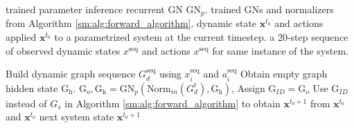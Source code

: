 \begin{algorithm}[tb]
   \caption{Forward prediction with System ID.}
   \label{sm:alg:sysid_forward}
\begin{algorithmic}
    trained parameter inference recurrent GN $\textrm{GN}_p$.
    trained GNs and normalizers from Algorithm \ref{sm:alg:forward_algorithm}.
    dynamic state $\textbf{x}^{t_0}$ and actions applied $\textbf{x}^{t_0}$ to a parametrized system at the current timestep.
    a 20-step sequence of observed dynamic states $x^\textrm{seq}$ and actions $x^\textrm{seq}$ for same instance of the system.
   
   \STATE Build dynamic graph sequence $G^\textrm{seq}_d$ using
   $x^\textrm{seq}_i$ and $a^\textrm{seq}_i$
   \STATE Obtain empty graph hidden state $\textrm{G}_\textrm{h}$.
   \STATE $\textrm{G}_{o},  \textrm{G}_\textrm{h} = \textrm{GN}_p(\textrm{Norm}_{in}(G^t_d), \textrm{G}_\textrm{h})$,
   \ENDFOR
   \STATE Assign $\textrm{G}_{ID} =\textrm{G}_{o}$
   \STATE Use $\textrm{G}_{ID}$ instead of $G_s$ in Algorithm \ref{sm:alg:forward_algorithm} to obtain $\textbf{x}^{t_0+1}$ from $\textbf{x}^{t_0}$ and $\textbf{x}^{t_0}$
    next system state $\textbf{x}^{t_0+1}$
\end{algorithmic}
\end{algorithm}

